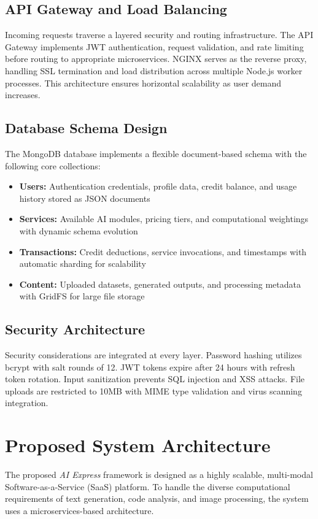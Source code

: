 \documentclass[conference]{IEEEtran}
\begin{document}
\subsection{API Gateway and Load Balancing}
Incoming requests traverse a layered security and routing infrastructure. The API Gateway implements JWT authentication, request validation, and rate limiting before routing to appropriate microservices. NGINX serves as the reverse proxy, handling SSL termination and load distribution across multiple Node.js worker processes. This architecture ensures horizontal scalability as user demand increases.

\subsection{Database Schema Design}
The MongoDB database implements a flexible document-based schema with the following core collections:
\begin{itemize}
    \item \textbf{Users:} Authentication credentials, profile data, credit balance, and usage history stored as JSON documents
    \item \textbf{Services:} Available AI modules, pricing tiers, and computational weightings with dynamic schema evolution
    \item \textbf{Transactions:} Credit deductions, service invocations, and timestamps with automatic sharding for scalability
    \item \textbf{Content:} Uploaded datasets, generated outputs, and processing metadata with GridFS for large file storage
\end{itemize}

\subsection{Security Architecture}
Security considerations are integrated at every layer. Password hashing utilizes bcrypt with salt rounds of 12. JWT tokens expire after 24 hours with refresh token rotation. Input sanitization prevents SQL injection and XSS attacks. File uploads are restricted to 10MB with MIME type validation and virus scanning integration.

\section{Proposed System Architecture}
The proposed \textit{AI Express} framework is designed as a highly scalable, multi-modal Software-as-a-Service (SaaS) platform. To handle the diverse computational requirements of text generation, code analysis, and image processing, the system uses a microservices-based architecture. 
\end{document}
